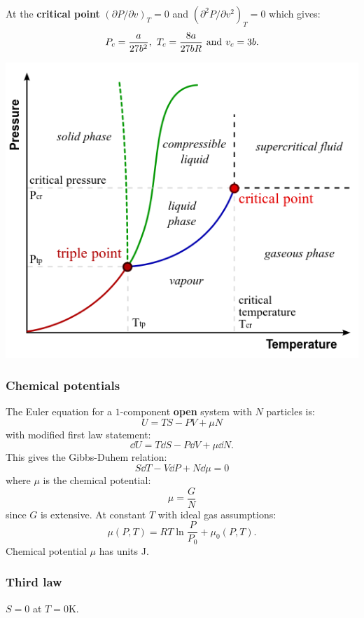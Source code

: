 \documentclass{article}
\begin{document}
\begin{multicols*}{3}
At the \textbf{critical point} $(\partial P/\partial v)_T=0$
and $(\partial^2 P/\partial v^2)_T=0$
which gives:
$$P_c=\frac{a}{27b^2},\hspace{0.05in}
T_c=\frac{8a}{27bR}
\hspace{0.05in}\text{and}\hspace{0.05in}
v_c=3b.$$
\begin{center}
    \includegraphics*[scale=0.25]{f1.png}
\end{center}

\newcolumn

\subsubsection*{Chemical potentials}
The Euler equation for a $1$-component
\textbf{open} system with
$N$ particles is:
$$U=TS-PV+\mu N$$
with modified first law statement: 
$$\dd U
=T\dd S-P\dd V+\mu\dd N.$$
This gives the Gibbs-Duhem relation:
$$S\dd T-V\dd P+N\dd\mu=0$$
where $\mu$ is the chemical potential:
$$\mu=\frac{G}{N}$$
since $G$ is extensive. At constant $T$
with ideal gas assumptions:
$$\mu(P,T)=RT\ln\frac{P}{P_0}+\mu_0(P,T).$$
Chemical potential $\mu$ has units J.

\subsubsection*{Third law}
$S=0$ at $T=0$K.

\end{multicols*}
\end{document}
